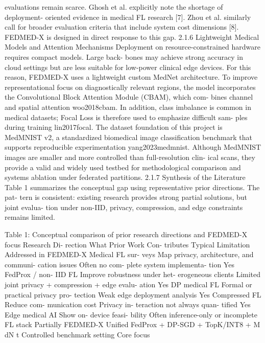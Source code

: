 evaluations remain scarce. Ghosh et al. explicitly note the shortage of deployment- oriented evidence in medical FL research [7]. Zhou et al. similarly call for broader evaluation criteria that include system cost dimensions [8]. FEDMED-X is designed in direct response to this gap.
2.1.6
Lightweight Medical Models and Attention Mechanisms
Deployment on resource-constrained hardware requires compact models. Large back- bones may achieve strong accuracy in cloud settings but are less suitable for low-power clinical edge devices. For this reason, FEDMED-X uses a lightweight custom MedNet architecture. To improve representational focus on diagnostically relevant regions, the model incorporates the Convolutional Block Attention Module (CBAM), which com- bines channel and spatial attention woo2018cbam. In addition, class imbalance is common in medical datasets; Focal Loss is therefore used to emphasize difficult sam- ples during training lin2017focal.
The dataset foundation of this project is MedMNIST v2, a standardized biomedical image classification benchmark that supports reproducible experimentation yang2023medmnist.
Although MedMNIST images are smaller and more controlled than full-resolution clin- ical scans, they provide a valid and widely used testbed for methodological comparison and systems ablation under federated partitions.
2.1.7
Synthesis of the Literature
Table 1 summarizes the conceptual gap using representative prior directions. The pat- tern is consistent: existing research provides strong partial solutions, but joint evalua- tion under non-IID, privacy, compression, and edge constraints remains limited.

Table 1: Conceptual comparison of prior research directions and FEDMED-X focus
Research
Di- rection
What Prior
Work
Con- tributes
Typical
Limitation
Addressed in FEDMED-X
Medical FL sur- veys
Map privacy, architecture, and communi- cation issues
Often no com- plete system implementa- tion
Yes
FedProx
/ non-
IID FL
Improve robustness under het- erogeneous clients
Limited joint privacy
+ compression
+ edge evalu- ation
Yes
DP medical FL
Formal or practical privacy pro- tection
Weak edge deployment analysis
Yes
Compressed FL
Reduce com- munication cost
Privacy in- teraction not always quan- tified
Yes
Edge medical AI
Show on- device feasi- bility
Often inference-only or incomplete
FL stack
Partially
FEDMED-X
Unified
FedProx
+
DP-SGD
+
TopK/INT8
+
M dN t
Controlled benchmark setting
Core focus

